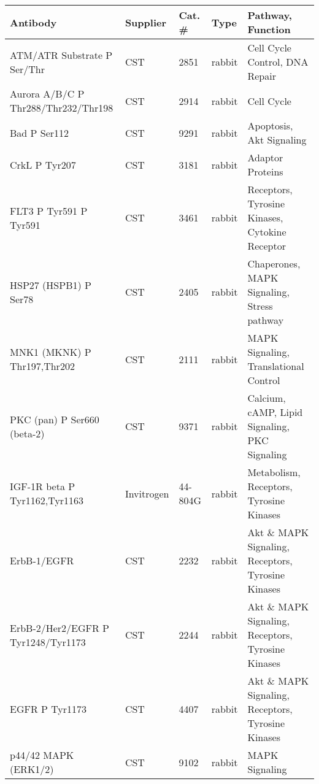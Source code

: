 \begin{tabular}{lllll}
\toprule
                                          Antibody &                     Supplier & Cat. \# &        Type &                                  Pathway, Function \\
\midrule
                       ATM/ATR Substrate P Ser/Thr &  CST &         2851 &      rabbit &                     Cell Cycle Control, DNA Repair \\
               Aurora A/B/C P Thr288/Thr232/Thr198 &  CST &         2914 &      rabbit &                                         Cell Cycle \\
                                      Bad P Ser112 &  CST &         9291 &      rabbit &                           Apoptosis, Akt Signaling \\
                                     CrkL P Tyr207 &  CST &         3181 &      rabbit &                                   Adaptor Proteins \\
                            FLT3 P Tyr591 P Tyr591 &  CST &         3461 &      rabbit &     Receptors, Tyrosine Kinases, Cytokine Receptor \\
                             HSP27 (HSPB1) P Ser78 &  CST &         2405 &      rabbit &         Chaperones, MAPK Signaling, Stress pathway \\
                       MNK1 (MKNK) P Thr197,Thr202 &  CST &         2111 &      rabbit &              MAPK Signaling, Translational Control \\
                       PKC (pan) P Ser660 (beta-2) &  CST &         9371 &      rabbit &      Calcium, cAMP, Lipid Signaling, PKC Signaling \\
                     IGF-1R beta P Tyr1162,Tyr1163 &       Invitrogen &      44-804G &      rabbit &            Metabolism, Receptors, Tyrosine Kinases \\
                                       ErbB-1/EGFR &  CST &         2232 &      rabbit &  Akt \& MAPK Signaling, Receptors, Tyrosine Kinases \\
                ErbB-2/Her2/EGFR P Tyr1248/Tyr1173 &  CST &         2244 &      rabbit &  Akt \& MAPK Signaling, Receptors, Tyrosine Kinases \\
                                    EGFR P Tyr1173 &  CST &         4407 &      rabbit &  Akt \& MAPK Signaling, Receptors, Tyrosine Kinases \\
                              p44/42 MAPK (ERK1/2) &  CST &         9102 &      rabbit &                                     MAPK Signaling \\

\end{tabular}
